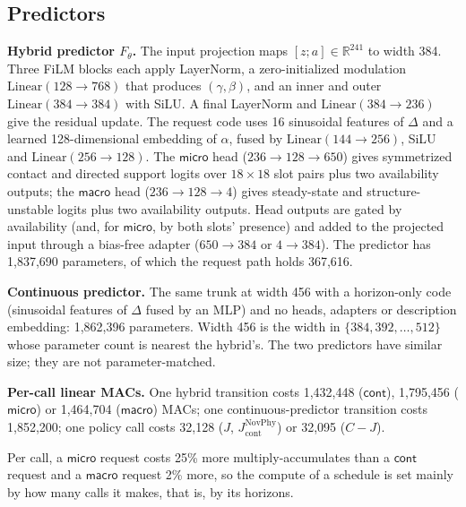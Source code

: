 \begin{revblock}
\subsection{Predictors}

\textbf{Hybrid predictor $F_\theta$.} The input projection maps $[z;a]\in\mathbb{R}^{241}$ to width 384. Three FiLM blocks each apply LayerNorm, a zero-initialized modulation $\mathrm{Linear}(128\to768)$ that produces $(\gamma,\beta)$, and an inner and outer $\mathrm{Linear}(384\to384)$ with SiLU. A final LayerNorm and $\mathrm{Linear}(384\to236)$ give the residual update. The request code uses 16 sinusoidal features of $\Delta$ and a learned 128-dimensional embedding of $\alpha$, fused by $\mathrm{Linear}(144\to256)$, SiLU and $\mathrm{Linear}(256\to128)$. The $\textsf{micro}$ head ($236\to128\to650$) gives symmetrized contact and directed support logits over $18\times18$ slot pairs plus two availability outputs; the $\textsf{macro}$ head ($236\to128\to4$) gives steady-state and structure-unstable logits plus two availability outputs. Head outputs are gated by availability (and, for $\textsf{micro}$, by both slots' presence) and added to the projected input through a bias-free adapter ($650\to384$ or $4\to384$). The predictor has 1,837,690 parameters, of which the request path holds 367,616.

\textbf{Continuous predictor.} The same trunk at width 456 with a horizon-only code (sinusoidal features of $\Delta$ fused by an MLP) and no heads, adapters or description embedding: 1,862,396 parameters. Width 456 is the width in $\{384,392,\dots,512\}$ whose parameter count is nearest the hybrid's. The two predictors have similar size; they are not parameter-matched.

\textbf{Per-call linear MACs.} One hybrid transition costs 1,432,448 ($\textsf{cont}$), 1,795,456 ($\textsf{micro}$) or 1,464,704 ($\textsf{macro}$) MACs; one continuous-predictor transition costs 1,852,200; one policy call costs 32,128 ($J$, $J_{\mathrm{cont}}^{\mathrm{NovPhy}}$) or 32,095 ($C\!-\!J$).
\end{revblock}
Per call, a $\textsf{micro}$ request costs 25\% more  multiply-accumulates than a $\textsf{cont}$ request and a $\textsf{macro}$ request 2\% more, so the compute of a schedule is set mainly by how many calls it makes, that is, by its horizons.
